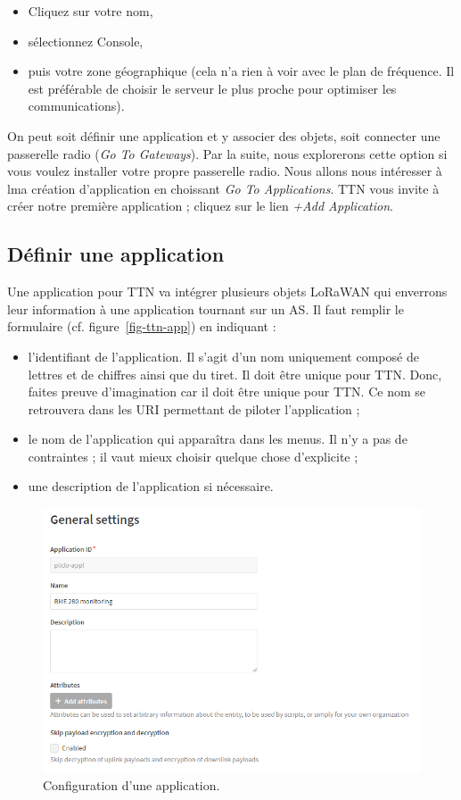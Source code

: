 \begin{itemize}
    \item Cliquez sur votre nom,
    \item sélectionnez Console,
    \item puis votre zone géographique (cela n'a rien à voir avec le plan de fréquence. Il est préférable de choisir le serveur le plus proche pour optimiser les communications).
\end{itemize}


On peut soit définir une application et y associer des objets, soit connecter une passerelle radio (\textit{Go To Gateways}). Par la suite, nous explorerons cette option si vous voulez installer votre propre passerelle radio. Nous allons nous intéresser à lma création d'application en choissant \textit{Go To Applications}. TTN vous invite à créer notre première application ; cliquez sur le lien \textit{+Add Application}.

\subsection*{Définir une application}

Une application pour TTN va intégrer plusieurs objets LoRaWAN qui enverrons leur information à une application tournant sur un \ac{AS}. 
Il faut remplir le formulaire (cf. figure~\vref{fig-ttn-app}) en indiquant :
\begin{itemize}
    \item l'identifiant de l'application. Il s'agit d'un nom uniquement composé de lettres et de chiffres ainsi que du tiret. Il doit être unique pour TTN. Donc, faites preuve d'imagination car il doit être unique pour TTN. Ce nom se retrouvera dans les URI permettant de piloter l'application ;
    \item le nom de l'application qui apparaîtra dans les menus. Il n'y a pas de contraintes ; il vaut mieux choisir quelque chose d'explicite ;
    \item une description de l'application si nécessaire.
\end{itemize}

\begin{figure}[tbp]
\centerline{\includegraphics[width=0.7\columnwidth]{Pictures/ttn-app.png} }
\caption{Configuration d'une application.}
\label{fig-ttn-app}
\end{figure}

